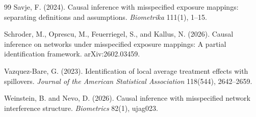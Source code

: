 \documentclass[11pt]{article}
\theoremstyle{definition}
\theoremstyle{plain}
\theoremstyle{remark}
\begin{document}
\begin{thebibliography}{99}
Savje, F. (2024).
Causal inference with misspecified exposure mappings: separating definitions and assumptions.
\emph{Biometrika} 111(1), 1--15.

Schroder, M., Oprescu, M., Feuerriegel, S., and Kallus, N. (2026).
Causal inference on networks under misspecified exposure mappings: A partial identification framework.
arXiv:2602.03459.

Vazquez-Bare, G. (2023).
Identification of local average treatment effects with spillovers.
\emph{Journal of the American Statistical Association} 118(544), 2642--2659.

Weinstein, B. and Nevo, D. (2026).
Causal inference with misspecified network interference structure.
\emph{Biometrics} 82(1), ujag023.

\end{thebibliography}
\end{document}

